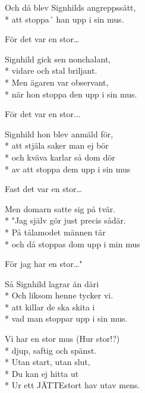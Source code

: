 \begin{SongText}
\begin{SongVerse}
        Och då blev Signhilds angreppssätt,\\*%
        att stoppa´ han upp i sin mus.
    \end{SongVerse}
    \begin{SongVerse}
        För det var en stor…
    \end{SongVerse}
    \begin{SongVerse}
        Signhild gick sen nonchalant,\\*%
        vidare och stal briljant.\\*%
        Men ägaren var observant,\\*%
        när hon stoppa den upp i sin mus.
    \end{SongVerse}
    \begin{SongVerse}
        För det var en stor...
    \end{SongVerse}
    \begin{SongVerse}
        Signhild hon blev anmäld för,\\*%
        att stjäla saker man ej bör\\*%
        och kväva karlar så dom dör\\*%
        av att stoppa dem upp i sin mus
    \end{SongVerse}
    \begin{SongVerse}
        Fast det var en stor…
    \end{SongVerse}
    \begin{SongVerse}
        Men domarn satte sig på tvär.\\*%
        "Jag själv gör just precis sådär.\\*%
        På tålamodet männen tär\\*%
        och då stoppas dom upp i min mus
    \end{SongVerse}
    \begin{SongVerse}
        För jag har en stor…"
    \end{SongVerse}
    \begin{SongVerse}
        Så Signhild lagrar än däri\\*%
        Och liksom henne tycker vi.\\*%
        att killar de ska skita i\\*%
        vad man stoppar upp i sin mus.
    \end{SongVerse}
    \begin{SongVerse}
        Vi har en stor mus (Hur stor!?)\\*%
        djup, saftig och spänst.\\*%
        Utan start, utan slut,\\*%
        Du kan ej hitta ut\\*%
        Ur ett JÄTTEstort hav utav mens.
    \end{SongVerse}
\end{SongText}
